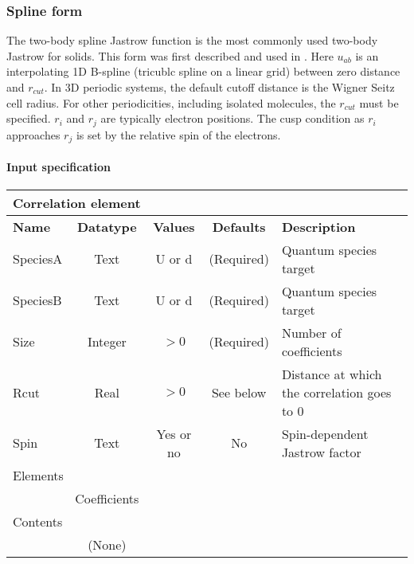\subsubsection{Spline form}
\label{sec:twobodyjastrowspline}

The two-body spline Jastrow function is the most commonly used two-body Jastrow for solids. This form 
was first described and used in \cite{EslerKimCeperleyShulenburger2012}.  
Here $u_{ab}$ is an interpolating 1D B-spline (tricublc spline on a linear grid) between 
zero distance and $r_{cut}$. In 3D periodic systems, 
the default cutoff distance is the Wigner Seitz cell radius. For other periodicities, including isolated 
molecules, the $r_{cut}$ must be specified.  $r_i$ and $r_j$ are typically electron positions.  The cusp 
condition as $r_i$ approaches $r_j$ is set by the relative spin of the electrons.

\FloatBarrier
\paragraph{Input specification}

\FloatBarrier
\begin{table}[h!]
\begin{center}
\begin{tabular}{l c c c l }
\hline
\multicolumn{5}{l}{Correlation element} \\
\hline
\bfseries Name & \bfseries Datatype & \bfseries Values & \bfseries Defaults & \bfseries Description \\
\hline
SpeciesA & Text & U or d & (Required) & Quantum species target \\
SpeciesB & Text & U or d & (Required) & Quantum species target \\
Size & Integer & $> 0$ & (Required) & Number of coefficients \\
Rcut & Real & $> 0$ & See below & Distance at which the correlation goes to 0 \\
Spin & Text & Yes or no & No & Spin-dependent Jastrow factor \\
\hline
\multicolumn{5}{l}{Elements}\\ \hline
& Coefficients & & & \\ \hline
\multicolumn{5}{l}{Contents}\\ \hline
& (None)  & & &  \\ \hline
\end{tabular}
\end{center}
\end{table}

